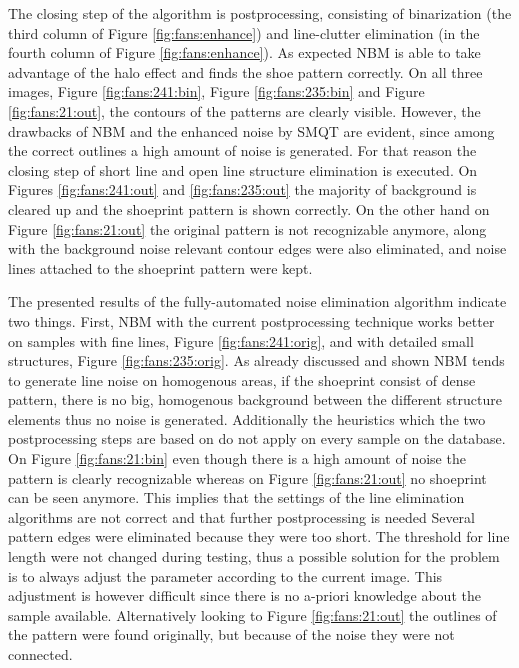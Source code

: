 \documentclass[draft,final]{vutinfth} %
\begin{document}
\par
The closing step of the algorithm is postprocessing, consisting of binarization (the third column of Figure \ref{fig:fans:enhance}) and line-clutter elimination (in the fourth column of Figure \ref{fig:fans:enhance}).
As expected NBM is able to take advantage of the halo effect and finds the shoe pattern correctly. 
On all three images, Figure \ref{fig:fans:241:bin}, Figure \ref{fig:fans:235:bin} and Figure \ref{fig:fans:21:out}, the contours of the patterns are clearly visible.
However, the drawbacks of NBM and the enhanced noise by SMQT are evident, since among the correct outlines a high amount of noise is generated.
For that reason the closing step of short line and open line structure elimination is executed.
On Figures \ref{fig:fans:241:out} and \ref{fig:fans:235:out} the majority of background is cleared up and the shoeprint pattern is shown correctly.
On the other hand on Figure \ref{fig:fans:21:out} the original pattern is not recognizable anymore, along with the background noise relevant contour edges were also eliminated, and noise lines attached to the shoeprint pattern were kept.
\par
The presented results of the fully-automated noise elimination algorithm indicate two things.
First, NBM with the current postprocessing technique works better on samples with fine lines, Figure \ref{fig:fans:241:orig}, and with detailed small structures, Figure \ref{fig:fans:235:orig}.
As already discussed and shown NBM tends to generate line noise on homogenous areas, if the shoeprint consist of dense pattern, there is no big, homogenous background between the different structure elements thus no noise is generated.
Additionally the heuristics which the two postprocessing steps are based on do not apply on every sample on the database.
On Figure  \ref{fig:fans:21:bin} even though there is a high amount of noise the pattern is clearly recognizable whereas on Figure \ref{fig:fans:21:out} no shoeprint can be seen anymore.
This implies that the settings of the line elimination algorithms are not correct and that further postprocessing is needed
Several pattern edges were eliminated because they were too short.
The threshold for line length were not changed during testing, thus a possible solution for the problem is to always adjust the parameter according to the current image.
This adjustment is however difficult since there is no a-priori knowledge about the sample available.
Alternatively looking to Figure  \ref{fig:fans:21:out} the outlines of the pattern were found originally, but because of the noise they were not connected.
\end{document}
